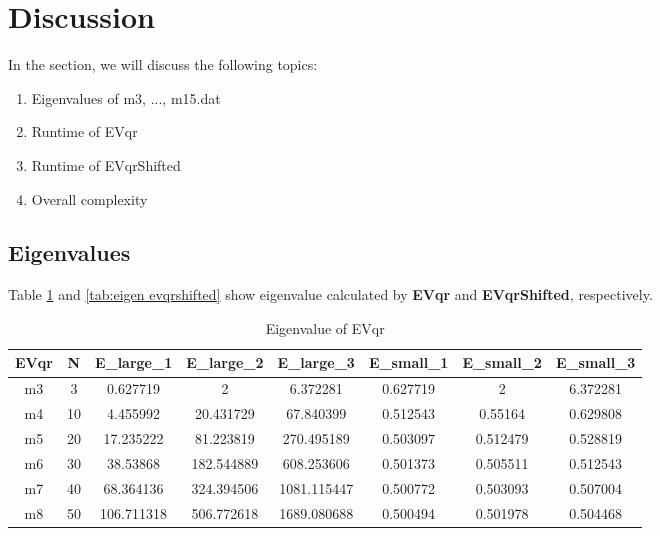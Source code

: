 \documentclass{article}
\begin{document}
\section{Discussion}
In the section, we will discuss the following topics:
\begin{enumerate}
    \item Eigenvalues of m3, ..., m15.dat
    \item Runtime of EVqr
    \item Runtime of EVqrShifted
    \item Overall complexity
\end{enumerate}

\subsection{Eigenvalues}
Table \ref{tab:eigen evqr} and \ref{tab:eigen evqrshifted} show eigenvalue calculated by \textbf{EVqr} and \textbf{EVqrShifted}, respectively.
\begin{table}[H]
    \begin{center}
        \begin{tabular}{|c|c|c|c|c|c|c|c|}
            \hline
            EVqr & N & E\_large\_1 & E\_large\_2 & E\_large\_3 & E\_small\_1 & E\_small\_2 & E\_small\_3 \\ \hline
            m3 & 3 & 0.627719 & 2 & 6.372281 & 0.627719 & 2 & 6.372281 \\ \hline
            m4 & 10 & 4.455992 & 20.431729 & 67.840399 & 0.512543 & 0.55164 & 0.629808 \\ \hline
            m5 & 20 & 17.235222 & 81.223819 & 270.495189 & 0.503097 & 0.512479 & 0.528819 \\ \hline
            m6 & 30 & 38.53868 & 182.544889 & 608.253606 & 0.501373 & 0.505511 & 0.512543 \\ \hline
            m7 & 40 & 68.364136 & 324.394506 & 1081.115447 & 0.500772 & 0.503093 & 0.507004 \\ \hline
            m8 & 50 & 106.711318 & 506.772618 & 1689.080688 & 0.500494 & 0.501978 & 0.504468 \\ \hline
        \end{tabular}
    \end{center}
    \caption{Eigenvalue of EVqr}
    \label{tab:eigen evqr}
\end{table}
\end{document}
